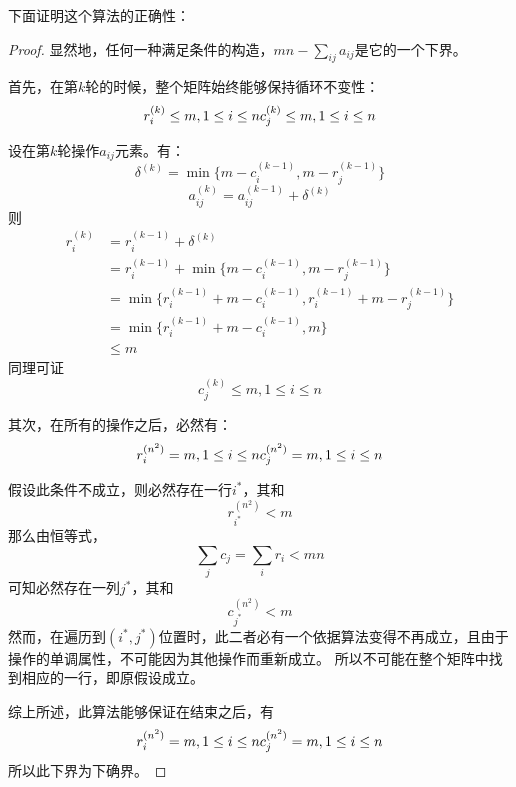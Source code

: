 \documentclass[UTF8]{ctexart}
\newtheorem*{proof}{证}[section]
\begin{document}
    下面证明这个算法的正确性：
    \begin{proof}
        显然地，任何一种满足条件的构造，$mn-\sum_{ij}{a_{ij}}$是它的一个下界。

        首先，在第$k$轮的时候，整个矩阵始终能够保持循环不变性：
        \begin{equation*}
            r_i^{(k)}\leq m, 1\leq i\leq n \\
            c_j^{(k)}\leq m, 1\leq i\leq n
        \end{equation*}

        设在第$k$轮操作$a_{ij}$元素。有：
        $$\delta^{(k)} = \min{\{m-c_i^{(k-1)}, m-r_j^{(k-1)}\}}$$
        $$a_{ij}^{(k)}=a_{ij}^{(k-1)} + \delta^{(k)}$$
        则
        \begin{align*}
            r_i^{(k)} &= r_i^{(k-1)} + \delta^{(k)} \\
            &= r_i^{(k-1)} + \min{\{m-c_i^{(k-1)}, m-r_j^{(k-1)}\}} \\
            &= \min{\{r_i^{(k-1)} + m-c_i^{(k-1)}, r_i^{(k-1)} + m - r_j^{(k-1)}\}} \\
            &= \min{\{r_i^{(k-1)} + m-c_i^{(k-1)}, m\}} \\
            &\leq m
        \end{align*}
        同理可证
        $$c_j^{(k)}\leq m, 1\leq i\leq n$$

        其次，在所有的操作之后，必然有：
        \begin{equation*}
            r_i^{(n^2)} = m, 1\leq i\leq n \\
            c_j^{(n^2)} = m, 1\leq i\leq n
        \end{equation*}

        假设此条件不成立，则必然存在一行$i^*$，其和
        $$r_{i^*}^{(n^2)} < m$$
        那么由恒等式，
        $$\sum_j{c_j}=\sum_i{r_i}<mn$$
        可知必然存在一列$j^*$，其和
        $$c_{j^*}^{(n^2)} < m$$
        然而，在遍历到$(i^*, j^*)$位置时，此二者必有一个依据算法变得不再成立，且由于操作的单调属性，不可能因为其他操作而重新成立。
        所以不可能在整个矩阵中找到相应的一行，即原假设成立。

        综上所述，此算法能够保证在结束之后，有
        \begin{equation*}
            r_i^{(n^2)} = m, 1\leq i\leq n \\
            c_j^{(n^2)} = m, 1\leq i\leq n
        \end{equation*}
        所以此下界为下确界。
    \end{proof}
\end{document}
